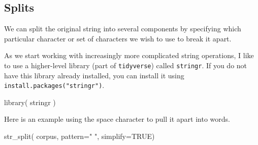 \documentclass[
  letterpaper,
]{book}
\newenvironment{Shaded}{\begin{snugshade}}{\end{snugshade}}
\newcommand{\AttributeTok}[1]{\textcolor[rgb]{0.40,0.45,0.13}{#1}}
\newcommand{\ConstantTok}[1]{\textcolor[rgb]{0.56,0.35,0.01}{#1}}
\newcommand{\FunctionTok}[1]{\textcolor[rgb]{0.28,0.35,0.67}{#1}}
\newcommand{\NormalTok}[1]{\textcolor[rgb]{0.00,0.23,0.31}{#1}}
\newcommand{\StringTok}[1]{\textcolor[rgb]{0.13,0.47,0.30}{#1}}
\begin{document}
\subsection{Splits}\label{splits}

We can split the original string into several components by specifying
which particular character or set of characters we wish to use to break
it apart.

As we start working with increasingly more complicated string
operations, I like to use a higher-level library (part of
\texttt{tidyverse}) called \texttt{stringr}. If you do not have this
library already installed, you can install it using
\texttt{install.packages("stringr")}.

\begin{Shaded}
\begin{Highlighting}[]
\FunctionTok{library}\NormalTok{( stringr )}
\end{Highlighting}
\end{Shaded}

Here is an example using the space character to pull it apart into
words.

\begin{Shaded}
\begin{Highlighting}[]
\FunctionTok{str\_split}\NormalTok{( corpus, }\AttributeTok{pattern=}\StringTok{" "}\NormalTok{, }\AttributeTok{simplify=}\ConstantTok{TRUE}\NormalTok{)}
\end{Highlighting}
\end{Shaded}
\end{document}
